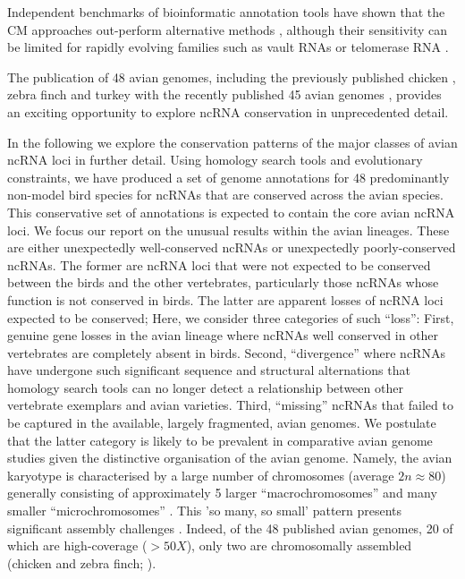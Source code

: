 \documentclass[10pt]{bmc_article}
\newenvironment{bmcformat}{\begin{raggedright}\baselineskip20pt\sloppy\setboolean{publ}{false}}{\end{raggedright}\baselineskip20pt\sloppy}
\begin{document}
\begin{bmcformat}
Independent benchmarks of bioinformatic annotation tools have shown
that the CM approaches out-perform alternative methods
\cite{Freyhult:2007}, although their sensitivity can be limited for
rapidly evolving families such as vault RNAs or telomerase RNA
\cite{Menzel:09a}.



The publication of 48 avian genomes, including the previously
published chicken
\cite{International_Chicken_Genome_Sequencing_Consortium:2004}, zebra
finch \cite{Warren:2010} and turkey \cite{Dalloul:2010} with the
recently published 45 avian genomes
\cite{birds:14,birds:14a,Huang:2013,Zhan:2013,Shapiro:2013,Howard:2013,Li:2014},
provides an exciting opportunity to explore ncRNA conservation in
unprecedented detail.

In the following we explore the conservation patterns of the major
classes of avian ncRNA loci in further detail.  Using homology search
tools and evolutionary constraints, we have produced a set of genome
annotations for 48 predominantly non-model bird species for ncRNAs
that are conserved across the avian species. This conservative set of
annotations is expected to contain the core avian ncRNA loci. We focus
our report on the unusual results within the avian lineages. These are
either unexpectedly well-conserved ncRNAs or unexpectedly
poorly-conserved ncRNAs. The former are ncRNA loci that were not
expected to be conserved between the birds and the other vertebrates,
particularly those ncRNAs whose function is not conserved in birds.
The latter are apparent losses of ncRNA loci expected to be conserved;
Here, we consider three categories of such ``loss'': First, genuine
gene losses in the avian lineage where ncRNAs well conserved in other
vertebrates are completely absent in birds.  Second, ``divergence''
where ncRNAs have undergone such significant sequence and structural
alternations that homology search tools can no longer detect a
relationship between other vertebrate exemplars and avian varieties.
Third, ``missing'' ncRNAs that failed to be captured in the available,
largely fragmented, avian genomes.  We postulate that the latter
category is likely to be prevalent in comparative avian genome studies
given the distinctive organisation of the avian genome. Namely, the
avian karyotype is characterised by a large number of chromosomes
(average $2n \approx 80$) generally consisting of approximately 5
larger ``macrochromosomes'' and many smaller ``microchromosomes''
\cite{Griffin:2007}. This ’so many, so small’ pattern presents
significant assembly challenges \cite{Ellegren:2005}. Indeed, of the
48 published avian genomes, 20 of which are high-coverage ($>50X$),
only two are chromosomally assembled (chicken and zebra finch;
\cite{birds:14,Warren:2010}).




\end{bmcformat}
\end{document}
